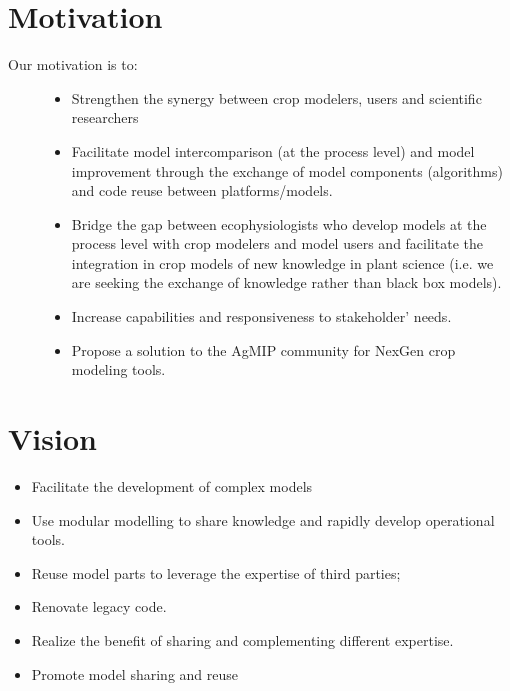 \documentclass[letterpaper,13pt,english]{sphinxmanual}
\begin{document}
\section{Motivation}
\label{\detokenize{user/overview:motivation}}\begin{description}
\item[{Our motivation is to:}] \leavevmode\begin{itemize}
\item {} 
Strengthen the synergy between crop modelers, users and scientific researchers

\item {} 
Facilitate model intercomparison (at the process level) and model improvement through the exchange of model components (algorithms) and code reuse between platforms/models.

\item {} 
Bridge the gap between ecophysiologists who develop models at the process level with crop modelers and model users and facilitate the integration in crop models of new knowledge in plant science (i.e. we are seeking the exchange of knowledge rather than black box models).

\item {} 
Increase capabilities and responsiveness to stakeholder’ needs.

\item {} 
Propose a solution to the AgMIP community for NexGen crop modeling tools.

\end{itemize}

\end{description}


\section{Vision}
\label{\detokenize{user/overview:vision}}\begin{itemize}
\item {} 
Facilitate the development of complex models

\item {} 
Use modular modelling to share knowledge and rapidly develop operational tools.

\item {} 
Reuse model parts to leverage the expertise of third parties;

\item {} 
Renovate legacy code.

\item {} 
Realize the benefit of sharing and complementing different expertise.

\item {} 
Promote model sharing and reuse

\end{itemize}
\end{document}
